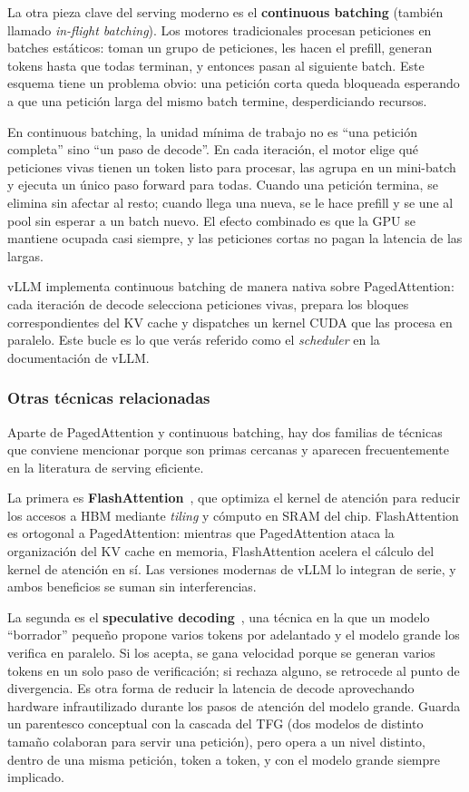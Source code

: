 La otra pieza clave del serving moderno es el \textbf{continuous batching} (también llamado \textit{in-flight batching}). Los motores tradicionales procesan peticiones en batches estáticos: toman un grupo de peticiones, les hacen el prefill, generan tokens hasta que todas terminan, y entonces pasan al siguiente batch. Este esquema tiene un problema obvio: una petición corta queda bloqueada esperando a que una petición larga del mismo batch termine, desperdiciando recursos.

En continuous batching, la unidad mínima de trabajo no es ``una petición completa'' sino ``un paso de decode''. En cada iteración, el motor elige qué peticiones vivas tienen un token listo para procesar, las agrupa en un mini-batch y ejecuta un único paso forward para todas. Cuando una petición termina, se elimina sin afectar al resto; cuando llega una nueva, se le hace prefill y se une al pool sin esperar a un batch nuevo. El efecto combinado es que la GPU se mantiene ocupada casi siempre, y las peticiones cortas no pagan la latencia de las largas.

vLLM implementa continuous batching de manera nativa sobre PagedAttention: cada iteración de decode selecciona peticiones vivas, prepara los bloques correspondientes del KV cache y dispatches un kernel CUDA que las procesa en paralelo. Este bucle es lo que verás referido como el \textit{scheduler} en la documentación de vLLM.

\subsubsection{Otras técnicas relacionadas}

Aparte de PagedAttention y continuous batching, hay dos familias de técnicas que conviene mencionar porque son primas cercanas y aparecen frecuentemente en la literatura de serving eficiente.

La primera es \textbf{FlashAttention}~\cite{dao2022flashattention, dao2023flash2}, que optimiza el kernel de atención para reducir los accesos a HBM mediante \textit{tiling} y cómputo en SRAM del chip. FlashAttention es ortogonal a PagedAttention: mientras que PagedAttention ataca la organización del KV cache en memoria, FlashAttention acelera el cálculo del kernel de atención en sí. Las versiones modernas de vLLM lo integran de serie, y ambos beneficios se suman sin interferencias.

La segunda es el \textbf{speculative decoding}~\cite{leviathan2023speculative}, una técnica en la que un modelo ``borrador'' pequeño propone varios tokens por adelantado y el modelo grande los verifica en paralelo. Si los acepta, se gana velocidad porque se generan varios tokens en un solo paso de verificación; si rechaza alguno, se retrocede al punto de divergencia. Es otra forma de reducir la latencia de decode aprovechando hardware infrautilizado durante los pasos de atención del modelo grande. Guarda un parentesco conceptual con la cascada del TFG (dos modelos de distinto tamaño colaboran para servir una petición), pero opera a un nivel distinto, dentro de una misma petición, token a token, y con el modelo grande siempre implicado.

